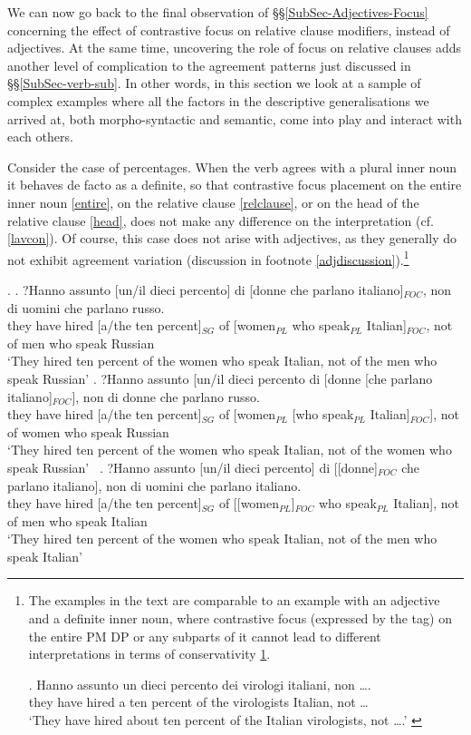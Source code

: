 \documentclass[charis, linguex]{glossa}
\begin{document}
We can now go back to the final observation of \S\S\ref{SubSec-Adjectives-Focus} concerning the effect of contrastive focus on relative clause modifiers, instead of adjectives. At the same time, uncovering the role of focus on relative clauses adds another level of complication to the agreement patterns just discussed in \S\S\ref{SubSec-verb-sub}. In other words, in this section we look at a sample of complex examples where all the factors in the descriptive generalisations we arrived at, both morpho-syntactic and semantic, come into play and interact with each others.


Consider the case of percentages. When the verb agrees with a plural inner noun it behaves de facto as a definite, so that contrastive focus placement on the entire inner noun \ref{entire}, on the relative clause \ref{relclause}, or on the head of the relative clause \ref{head}, does not make any difference on the interpretation (cf. \ref{lavcon}). Of course, this case does not arise with adjectives, as they generally do not exhibit agreement variation (discussion in footnote \ref{adjdiscussion}).\footnote{The examples in the text are comparable to an example with an adjective and a definite inner noun, where contrastive focus (expressed by the tag) on the entire PM DP or any subparts of it cannot lead to different interpretations in terms of conservativity \ref{virinf}.

\exg.  Hanno assunto un dieci percento dei virologi italiani, non \ldots.  \\
        {they have} hired a ten percent {of the} virologists Italian, not \ldots \\
         \glt `They have hired about ten percent of the Italian virologists, not \ldots.'  \label{virinf}

		
}

\ex. \ag. ?Hanno assunto [un/il dieci percento] di [donne che parlano italiano]$_{FOC}$, non di uomini che parlano russo. \\
     {they have} hired [a/the ten percent]$_{SG}$ of [women$_{PL}$ who speak$_{PL}$ Italian]$_{FOC}$, not of men who speak Russian \\
     \glt `They hired ten percent of the women who speak Italian, not of the men who speak Russian' \label{entire}
\bg. ?Hanno assunto [un/il dieci percento di [donne  [che parlano  italiano]$_{FOC}$], non di donne che parlano russo. \\
     {they have} hired [a/the ten percent]$_{SG}$ of [women$_{PL}$ [who speak$_{PL}$ Italian]$_{FOC}$], not of women who speak Russian \\
	 \glt `They hired ten percent of the women who speak Italian, not of the women who speak Russian' \label{relclause}\	
\cg. ?Hanno assunto [un/il dieci percento] di [[donne]$_{FOC}$ che parlano italiano], non di uomini che parlano italiano. \\
     {they have} hired [a/the ten percent]$_{SG}$             of [[women$_{PL}$]$_{FOC}$ who speak$_{PL}$ Italian], not of men who speak Italian \\
	 \glt `They hired ten percent of the women who speak Italian, not of the men who speak Italian' \label{head}
	 
\end{document}
